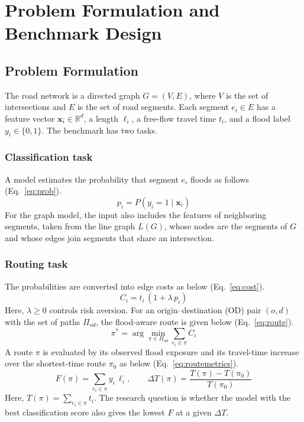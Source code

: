 \section{Problem Formulation and Benchmark Design}
\label{sec:method}

\subsection{Problem Formulation}
The road network is a directed graph $G=(V,E)$, where $V$ is the set of intersections and $E$ is the set of road segments. Each segment $e_i \in E$ has a feature vector $\mathbf{x}_i \in \mathbb{R}^{d}$, a length $\ell_i$, a free-flow travel time $t_i$, and a flood label $y_i \in \{0,1\}$. The benchmark has two tasks.

\subsubsection{Classification task}
A model estimates the probability that segment $e_i$ floods as follows (Eq.~\ref{eq:prob}).
\begin{equation}
  p_i = P(y_i = 1 \mid \mathbf{x}_i)
  \label{eq:prob}
\end{equation}
For the graph model, the input also includes the features of neighboring segments, taken from the line graph $L(G)$, whose nodes are the segments of $G$ and whose edges join segments that share an intersection.

\subsubsection{Routing task}
The probabilities are converted into edge costs as below (Eq.~\ref{eq:cost}).
\begin{equation}
  C_i = t_i \,(1 + \lambda\, p_i)
  \label{eq:cost}
\end{equation}
Here, $\lambda \geq 0$ controls risk aversion. For an origin--destination (OD) pair $(o,d)$ with the set of paths $\Pi_{od}$, the flood-aware route is given below (Eq.~\ref{eq:route}).
\begin{equation}
  \pi^{*} = \arg\min_{\pi \in \Pi_{od}} \sum_{e_i \in \pi} C_i
  \label{eq:route}
\end{equation}
A route $\pi$ is evaluated by its observed flood exposure and its travel-time increase over the shortest-time route $\pi_0$ as below (Eq.~\ref{eq:routemetrics}).
\begin{equation}
  F(\pi) = \sum_{e_i \in \pi} y_i\, \ell_i, \qquad
  \Delta T(\pi) = \frac{T(\pi) - T(\pi_0)}{T(\pi_0)}
  \label{eq:routemetrics}
\end{equation}
Here, $T(\pi)=\sum_{e_i \in \pi} t_i$. The research question is whether the model with the best classification score also gives the lowest $F$ at a given $\Delta T$.

